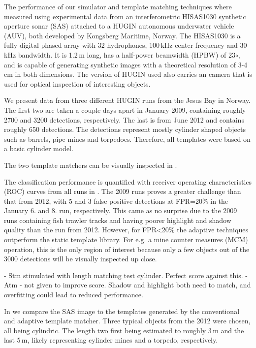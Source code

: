 \newlength\imgspacing\setlength\imgspacing{.5cm}
\setcounter{topnumber}{2}

The performance of our simulator and template matching techniques where measured using experimental data from an interferometric HISAS1030 synthetic aperture sonar (SAS) attached to a HUGIN autonomous underwater vehicle (AUV), both developed by Kongsberg Maritime, Norway. The HISAS1030 is a fully digital phased array with 32 hydrophones, 100\,kHz center frequency and 30\,kHz bandwidth. It is 1.2\,m long, has a half-power beamwidth (HPBW) of 23$\circ$, and is capable of generating synthetic images with a theoretical resolution of 3-4\,cm in both dimensions. The version of HUGIN used also carries an camera that is used for optical inspection of interesting objects.

We present data from three different HUGIN runs from the Jesus Bay in Norway. The first two are taken a couple days apart in January 2009, containing roughly 2700 and 3200 detections, respectively. The last is from June 2012 and contains roughly 650 detections. The detections represent mostly cylinder shaped objects such as barrels, pipe mines and torpedoes. Therefore, all templates were based on a basic cylinder model.




The two template matchers can be visually inspected in . 

The classification performance is quantified with receiver operating characteristics (ROC) curves from all runs in . The 2009 runs proves a greater challenge than that from 2012, with 5 and 3 false positive detections at FPR=20\% in the January 6. and 8. run, respectively. This came as no surprise due to the 2009 runs containing fish trawler tracks and having poorer highlight and shadow quality than the run from 2012. However, for FPR<20\% the adaptive techniques outperform the static template library. For e.g. a mine counter measures (MCM) operation, this is the only region of interest because only a few objects out of the 3000 detections will be visually inspected up close.

- Stm stimulated with length matching test cylinder. Perfect score against this.
- Atm - not given to improve score. Shadow and highlight both need to match, and overfitting could lead to reduced performance.

In  we compare the SAS image to the templates generated by the conventional and adaptive template matcher. Three typical objects from the 2012 were chosen, all being cylindric. The length two first being estimated to roughly 3\,m and the last 5\,m, likely representing cylinder mines and a torpedo, respectively. 


